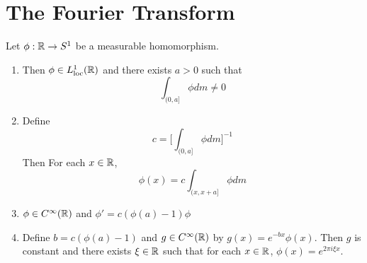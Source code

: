 \documentclass{book}
\begin{document}
	
	
	
	
	
	
	
	
	\newpage
	\section{The Fourier Transform}
	
	\begin{defn}
	
	\end{defn}	
	
	\begin{ex}
	 Let $\phi:\mathbb{R} \rightarrow S^1$ be a measurable homomorphism. 
	\begin{enumerate}
	\item Then $\phi \in L^1_{\text{loc}}(\mathbb{R})$ and there exists $a > 0$ such that $$\int_{(0,a]}\phi dm \neq 0$$
	\item Define $$c = \bigg[ \int_{(0,a]}\phi dm \bigg]^{-1}$$ 
	Then  For each $x \in \mathbb{R}$, $$\phi(x) = c\int_{(x, x+a]}\phi dm$$ 
	\item $\phi \in C^{\infty}(\mathbb{R})$ and $\phi' = c(\phi(a) - 1)\phi$
	\item Define $b = c(\phi(a) - 1)$ and $g \in C^{\infty}(\mathbb{R})$ by $g(x) = e^{-bx} \phi(x)$. Then $g$ is constant and there exists $\xi \in \mathbb{R}$ such that for each $x \in \mathbb{R}$, $\phi(x) = e^{2 \pi i \xi x}$.
	\end{enumerate}
	\end{ex}	
	
\end{document}
